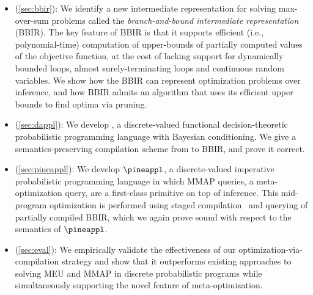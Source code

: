 \begin{itemize}[leftmargin=*]
  \item (\cref{sec:bbir}): We identify a new intermediate
  representation for solving max-over-sum problems called the
  \emph{branch-and-bound intermediate representation} (BBIR).  The key feature
  of BBIR is that it supports efficient (i.e., polynomial-time) computation of
  upper-bounds of partially computed values of the objective function,
  at the cost of lacking support for dynamically bounded loops, almost surely-terminating loops and continuous random variables.
  We show how the BBIR can represent optimization problems over inference, and how BBIR admits an algorithm that uses
  its efficient upper bounds to find optima via pruning.
  \item (\cref{sec:dappl}): We develop \dappl{}, a discrete-valued
  functional decision-theoretic probabilistic programming language with Bayesian
  conditioning. We give a semantics-preserving
  compilation scheme from \dappl{} to BBIR, and prove it correct.
  \item (\cref{sec:pineappl}): We develop $\pineappl$, a discrete-valued
  imperative probabilistic programming language in which MMAP queries, a meta-optimization query,
  are a first-class primitive
  on top of inference. This mid-program optimization is performed using
  staged compilation~\citep{chambers2002staged,rompf2010lightweight,devito2013terra} and
  querying of partially compiled BBIR, which we again prove sound with respect to
  the semantics of $\pineappl$.
  \item (\cref{sec:eval}): We empirically validate the effectiveness of
  our optimization-via-compilation strategy and show that it
  outperforms existing approaches to solving MEU and MMAP in discrete probabilistic programs
  while simultaneously supporting the novel feature of meta-optimization.
\end{itemize}
